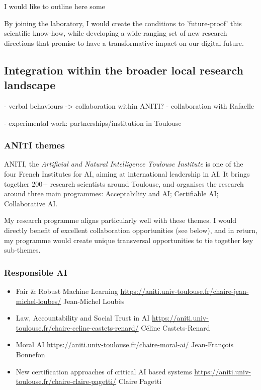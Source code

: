 I would like to outline here some

By joining the laboratory, I would create the conditions to
'future-proof' this scientific know-how, while developing a wide-ranging set of
new research directions that promise to have a transformative impact on our
digital future.

\newpage
\subsection{Integration within the broader local research landscape}\label{collaborations}


- verbal behaviours -> collaboration within ANITI?
- collaboration with Rafaelle

- experimental work: partnerships/institution in Toulouse


\subsubsection{ANITI themes}

ANITI, the \emph{Artificial and Natural Intelligence Toulouse Institute} is one
of the four French Institutes for AI, aiming at international leadership in AI.
It brings together 200+ research scientists around Toulouse, and organises the
research around three main programmes: Acceptability and AI; Certifiable AI;
Collaborative AI.

My research programme aligns particularly well with these themes. I would
directly benefit of excellent collaboration opportunities (see below), and in
return, my programme would create unique transversal opportunities to tie
together key sub-themes.


\subsubsection{Responsible AI}


\begin{itemize}
    \item Fair \& Robust Machine Learning
        \url{https://aniti.univ-toulouse.fr/chaire-jean-michel-loubes/}
Jean-Michel Loubès

\item Law, Accountability and Social Trust in AI
    \url{https://aniti.univ-toulouse.fr/chaire-celine-castets-renard/}
Céline Castets-Renard

\item Moral AI
    \url{https://aniti.univ-toulouse.fr/chaire-moral-ai/}
Jean-François Bonnefon

\item New certification approaches of critical AI based systems 
    \url{https://aniti.univ-toulouse.fr/chaire-claire-pagetti/}
Claire Pagetti

\end{itemize}

